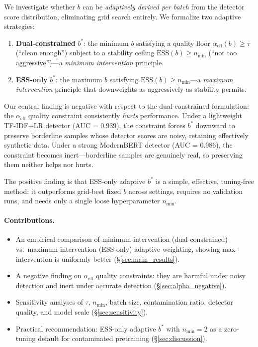 \documentclass[11pt]{article}
\begin{document}
We investigate whether $b$ can be \emph{adaptively derived per batch} from the detector score distribution, eliminating grid search entirely. We formalize two adaptive strategies:

\begin{enumerate}
    \item \textbf{Dual-constrained} $b^*$: the minimum $b$ satisfying a quality floor $\alpha_{\mathrm{eff}}(b) \geq \tau$ (``clean enough'') subject to a stability ceiling $\mathrm{ESS}(b) \geq n_{\min}$ (``not too aggressive'')---a \emph{minimum intervention} principle.
    \item \textbf{ESS-only} $b^*$: the maximum $b$ satisfying $\mathrm{ESS}(b) \geq n_{\min}$---a \emph{maximum intervention} principle that downweights as aggressively as stability permits.
\end{enumerate}

Our central finding is negative with respect to the dual-constrained formulation: the $\alpha_{\mathrm{eff}}$ quality constraint consistently \emph{hurts} performance. Under a lightweight TF-IDF+LR detector (AUC = 0.939), the constraint forces $b^*$ downward to preserve borderline samples whose detector scores are noisy, retaining effectively synthetic data. Under a strong ModernBERT detector (AUC = 0.986), the constraint becomes inert---borderline samples are genuinely real, so preserving them neither helps nor hurts.

The positive finding is that ESS-only adaptive $b^*$ is a simple, effective, tuning-free method: it outperforms grid-best fixed $b$ across settings, requires no validation runs, and needs only a single loose hyperparameter $n_{\min}$.

\paragraph{Contributions.}
\begin{itemize}
    \item An empirical comparison of minimum-intervention (dual-constrained) vs.\ maximum-intervention (ESS-only) adaptive weighting, showing max-intervention is uniformly better (\S\ref{sec:main_results}).
    \item A negative finding on $\alpha_{\mathrm{eff}}$ quality constraints: they are harmful under noisy detection and inert under accurate detection (\S\ref{sec:alpha_negative}).
    \item Sensitivity analyses of $\tau$, $n_{\min}$, batch size, contamination ratio, detector quality, and model scale (\S\ref{sec:sensitivity}).
    \item Practical recommendation: ESS-only adaptive $b^*$ with $n_{\min}=2$ as a zero-tuning default for contaminated pretraining (\S\ref{sec:discussion}).
\end{itemize}
\end{document}
